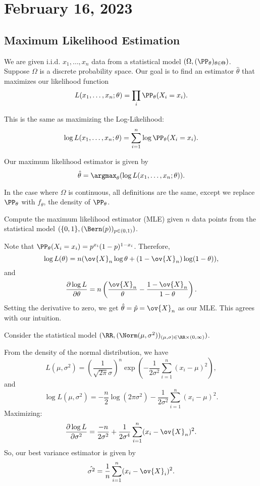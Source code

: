 \section{February 16, 2023}

\subsection{Maximum Likelihood Estimation}

We are given i.i.d. $x_1, \hdots, x_n$ data from a statistical model $(\Omega, (\PP_{\theta})_{\theta\in \Theta})$. Suppose $\Omega$ is a discrete probability space. Our goal is to find an estimator $\hat{\theta}$ that maximizes our \ac{likelihood function} 
\[L(x_1, \hdots, x_n; \theta) = \prod_i\PP_{\theta}(X_i = x_i).\]

This is the same as maximizing the \ac{Log-Likelihood}:
\[\log L(x_1, \hdots, x_n; \theta) = \sum_{i=1}^n\log \PP_{\theta}(X_i=x_i).\]

Our \ac{maximum likelihood estimator} is given by 
\[\hat{\theta} = \argmax_{\theta}(\log L(x_1, \hdots, x_n; \theta)).\]

In the case where $\Omega$ is continuous, all definitions are the same, except we replace $\PP_{\theta}$ with $f_{\theta}$, the density of $\PP_{\theta}$. 


\begin{example}
\exlabel\hypertarget{ex:mlebern}{}

Compute the maximum likelihood estimator (MLE) given $n$ data points from the statistical model $(\{0,1\}, (\Bern(p))_{p\in (0,1)})$.
\end{example}

Note that $\PP_{\theta}(X_i=x_i) = p^{x_i}(1-p)^{1-x_i}$. Therefore, 
\[\log L(\theta) = n(\ov{X}_n\log \theta + (1-\ov{X}_n)\log (1-\theta)),\]
and 
\[\frac{\partial \log L}{\partial \theta} = n\left(\frac{\ov{X}_n}{\theta} - \frac{1-\ov{X}_n}{1-\theta}\right).\]
Setting the derivative to zero, we get $\hat{\theta} = \hat{p} = \ov{X}_n$ as our MLE. This agrees with our intuition. 

\begin{example}
\exlabel

Consider the statistical model $(\RR, (\Norm(\mu, \sigma^2))_{(\mu, \sigma)\in \RR\times (0, \infty)})$. 
\end{example}

From the density of the normal distribution, we have
\[L(\mu, \sigma^2) = \left(\frac{1}{\sqrt{2\pi}\sigma}\right)^n\exp \left(-\frac{1}{2\sigma^2}\sum_{i=1}^n(x_i-\mu)^2\right),\]
and 
\[\log L(\mu, \sigma^2) = -\frac{n}{2}\log (2\pi \sigma^2) - \frac{1}{2\sigma^2}\sum_{i=1}^n(x_i-\mu)^2.\]
Maximizing:
\[\frac{\partial \log L}{\partial \sigma^2} = \frac{-n}{2\sigma^2} + \frac{1}{2\sigma^4}\sum_{i=1}^{n}(x_i-\ov{X}_n)^2.\]
So, our best variance estimator is given by 
\[\hat{\sigma^2} = \frac{1}{n}\sum_{i=1}^n(x_i - \ov{X}_i)^2.\]

